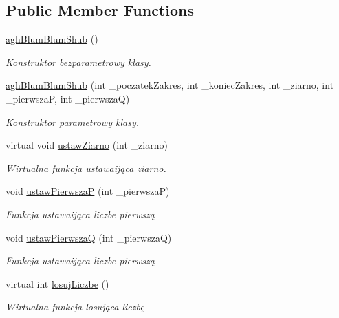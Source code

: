 \subsection*{\-Public \-Member \-Functions}
\begin{DoxyCompactItemize}
\item 
\hypertarget{classaghBlumBlumShub_a9396f651ba093efee9bdbdd6371d468c}{\hyperlink{classaghBlumBlumShub_a9396f651ba093efee9bdbdd6371d468c}{agh\-Blum\-Blum\-Shub} ()}\label{classaghBlumBlumShub_a9396f651ba093efee9bdbdd6371d468c}

\begin{DoxyCompactList}\small\item\em \-Konstruktor bezparametrowy klasy. \end{DoxyCompactList}\item 
\hyperlink{classaghBlumBlumShub_a1188d0744baa38f49c10333021bd864a}{agh\-Blum\-Blum\-Shub} (int \-\_\-poczatek\-Zakres, int \-\_\-koniec\-Zakres, int \-\_\-ziarno, int \-\_\-pierwsza\-P, int \-\_\-pierwsza\-Q)
\begin{DoxyCompactList}\small\item\em \-Konstruktor parametrowy klasy. \end{DoxyCompactList}\item 
virtual void \hyperlink{classaghBlumBlumShub_a5c227b9f3044159544ac20fb5b1f2e1c}{ustaw\-Ziarno} (int \-\_\-ziarno)
\begin{DoxyCompactList}\small\item\em \-Wirtualna funkcja ustawaijąca ziarno. \end{DoxyCompactList}\item 
void \hyperlink{classaghBlumBlumShub_a194c8137ab486ea0a95b56fc4485566f}{ustaw\-Pierwsza\-P} (int \-\_\-pierwsza\-P)
\begin{DoxyCompactList}\small\item\em \-Funkcja ustawaijąca liczbe pierwszą \end{DoxyCompactList}\item 
void \hyperlink{classaghBlumBlumShub_a9b03ee0b06b667acaaec54b81cdefbbe}{ustaw\-Pierwsza\-Q} (int \-\_\-pierwsza\-Q)
\begin{DoxyCompactList}\small\item\em \-Funkcja ustawaijąca liczbe pierwszą \end{DoxyCompactList}\item 
virtual int \hyperlink{classaghBlumBlumShub_a4aacbcc18ec41812820301959857ce29}{losuj\-Liczbe} ()
\begin{DoxyCompactList}\small\item\em \-Wirtualna funkcja losująca liczbę \end{DoxyCompactList}\end{DoxyCompactItemize}


